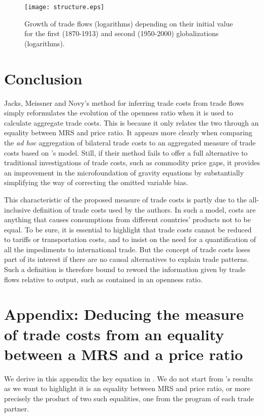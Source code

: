 \documentclass{article}
\begin{document}
\begin{figure}
\centering
\texttt{[image: structure.eps]}
\caption{Growth of trade flows (logarithms) depending on their initial value for the first (1870-1913) and second (1950-2000) globalizations (logarithms).}\label{structure}
\end{figure}

\section{\label{5} Conclusion}

Jacks, Meissner and Novy's method for inferring trade costs
from trade flows simply reformulates the evolution of the
openness ratio when it is used to calculate aggregate trade
costs. This is because it only relates the two through an
equality between MRS and price ratio. It appears more clearly
when comparing the \textit{ad hoc} aggregation of bilateral trade costs
to an aggregated measure of trade costs based on
\cite{AW2003}'s model. Still, if their method fails to offer a
full alternative to traditional investigations of trade costs,
such as commodity price gaps, it provides an improvement in the
microfoundation of gravity equations by substantially
simplifying the way of correcting the omitted variable bias.

This characteristic of the proposed measure of trade costs is
partly due to the all-inclusive definition of trade
costs used by the authors. In such a model, costs are anything
that causes consumptions from different countries' products not
to be equal. To be sure, it is essential to highlight that
trade costs cannot be reduced to tariffs or transportation
costs, and to insist on the need for a quantification of all
the impediments to international trade. But the concept of
trade costs loses part of its interest if there are no causal
alternatives to explain trade patterns. Such a definition is
therefore bound to reword the information given by trade
flows relative to output, such as contained in an openness
ratio.

\appendix

\section{\label{A1}Appendix: Deducing the measure of trade costs from an equality between a MRS and a price ratio}

We derive in this appendix the key equation in \cite{JMN2011}.
We do not start from \cite{AW2003}'s results as we want to
highlight it is an equality between MRS and price ratio, or
more precisely the product of two such equalities, one from the
program of each trade partner.
\end{document}
